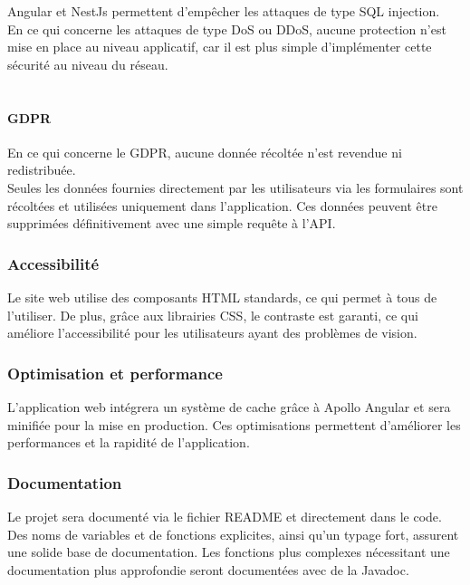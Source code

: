 Angular et NestJs permettent d'empêcher les attaques de type SQL injection. \\

En ce qui concerne les attaques de type DoS ou DDoS, aucune protection n'est mise en place au niveau applicatif, car il est plus simple d'implémenter cette sécurité au niveau du réseau.\\\\

\paragraph{GDPR}
En ce qui concerne le GDPR, aucune donnée récoltée n'est revendue ni redistribuée.\\

Seules les données fournies directement par les utilisateurs via les formulaires sont récoltées et utilisées uniquement dans l'application.
Ces données peuvent être supprimées définitivement avec une simple requête à l'API\@.

\subsubsection{Accessibilité}

Le site web utilise des composants HTML standards, ce qui permet à tous de l'utiliser.
De plus, grâce aux librairies CSS, le contraste est garanti, ce qui améliore l'accessibilité pour les utilisateurs ayant des problèmes de vision.

\subsubsection{Optimisation et performance}

L'application web intégrera un système de cache grâce à Apollo Angular et sera minifiée pour la mise en production.
Ces optimisations permettent d'améliorer les performances et la rapidité de l'application.

\subsubsection{Documentation}

Le projet sera documenté via le fichier README et directement dans le code.
Des noms de variables et de fonctions explicites, ainsi qu'un typage fort, assurent une solide base de documentation.
Les fonctions plus complexes nécessitant une documentation plus approfondie seront documentées avec de la Javadoc.\\

